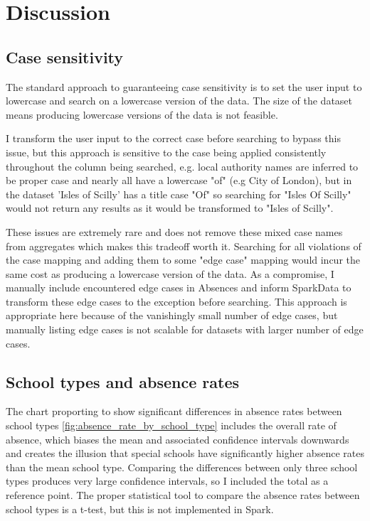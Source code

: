 \documentclass{article}
\begin{document}
\section*{Discussion}
    \subsection*{Case sensitivity}
    The standard approach to guaranteeing case sensitivity is to set the user input to lowercase and search on a lowercase version of the data. The size of the dataset means producing lowercase versions of the data is not feasible. 
    
    I transform the user input to the correct case before searching to bypass this issue, but this approach is sensitive to the case being applied consistently throughout the column being searched, e.g. local authority names are inferred to be proper case and nearly all have a lowercase "of" (e.g City of London), but in the dataset 'Isles of Scilly' has a title case "Of" so searching for "Isles Of Scilly" would not return any results as it would be transformed to "Isles of Scilly".
    
    These issues are extremely rare and does not remove these mixed case names from aggregates which makes this tradeoff worth it. Searching for all violations of the case mapping and adding them to some "edge case" mapping would incur the same cost as producing a lowercase version of the data. As a compromise, I manually include encountered edge cases in Absences and inform SparkData to transform these edge cases to the exception before searching. This approach is appropriate here because of the vanishingly small number of edge cases, but manually listing edge cases is not scalable for datasets with larger number of edge cases.
    
    \subsection*{School types and absence rates}
    The chart proporting to show significant differences in absence rates between school types \ref{fig:absence_rate_by_school_type} includes the overall rate of absence, which biases the mean and associated confidence intervals downwards and creates the illusion that special schools have significantly higher absence rates than the mean school type. Comparing the differences between only three school types produces very large confidence intervals, so I included the total as a reference point. The proper statistical tool to compare the absence rates between school types is a t-test, but this is not implemented in Spark.
\end{document}
